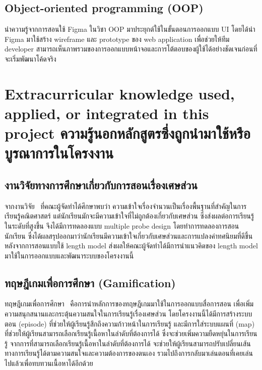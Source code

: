     \subsection{Object-oriented programming (OOP)}
    นำความรู้จากการสอนใช้ Figma ในวิชา OOP มาประยุกต์ใช้ในขั้นตอนการออกแบบ UI โดยได้นำ Figma มาใช้สร้าง wireframe และ prototype ของ web application 
    เพื่อช่วยให้ทีม developer สามารถเห็นภาพรวมของการออกแบบหน้าจอและการโต้ตอบของผู้ใช้ได้อย่างชัดเจนก่อนที่จะเริ่มพัฒนาโค้ดจริง

\section{\ifenglish%
Extracurricular knowledge used, applied, or integrated in this project
\else%
ความรู้นอกหลักสูตรซึ่งถูกนำมาใช้หรือบูรณาการในโครงงาน
\fi
}
\subsection{งานวิจัยทางการศึกษาเกี่ยวกับการสอนเรื่องเศษส่วน}
    จากงานวิจัย~\cite{rojo_length_models} ที่คณะผู้จัดทำได้ศึกษาพบว่า ความเข้าใจเรื่องจำนวนเป็นเรื่องพื้นฐานที่สำคัญในการเรียนรู้คณิตศาสตร์ แต่นักเรียนมักจะมีความเข้าใจที่ไม่ถูกต้องเกี่ยวกับเศษส่วน ซึ่งส่งผลต่อการเรียนรู้ในระดับที่สูงขึ้น
    จึงได้มีการทดลองแบบ multiple probe design โดยทำการทดลองการสอนนักเรียน ซึ่งได้ผลสรุปออกมาว่านักเรียนมีความเข้าใจเกี่ยวกับเศษส่วนและการแปลงค่าทศนิยมที่ดีขึ้นหลังจากการสอนแบบใช้ length model
    ส่งผลให้คณะผู้จัดทำได้มีการนำแนวคิดของ length model มาใช้ในการออกแบบและพัฒนาระบบของโครงงานนี้

\subsection[ทฤษฎีเกมเพื่อการศึกษา]{ทฤษฎีเกมเพื่อการศึกษา (Gamification)}
    ทฤษฎีเกมเพื่อการศึกษา~\cite{Gamifi} คือการนำหลักการของทฤษฎีเกมมาใช้ในการออกแบบสื่อการสอน เพื่อเพิ่มความสนุกสนานและกระตุ้นความสนใจในการเรียนรู้เรื่องเศษส่วน โดยโครงงานนี้ได้มีการสร้างระบบตอน (episode) ที่ช่วยให้ผู้เรียนรู้สึกถึงความก้าวหน้าในการเรียนรู้
    และมีการใส่ระบบแผนที่ (map) ที่ช่วยให้ผู้เรียนสามารถเลือกเรียนรู้เนื้อหาในลำดับที่ต้องการได้ ซึ่งจะช่วยเพิ่มความยืดหยุ่นในการเรียนรู้ จากการที่สามารถเลือกเรียนรู้เนื้อหาในลำดับที่ต้องการได้ จะช่วยให้ผู้เรียนสามารถปรับเปลี่ยนเส้นทางการเรียนรู้ได้ตามความสนใจและความต้องการของตนเอง รวมไปถึงการกลับมาเล่นตอนที่เคยเล่นไปแล้วเพื่อทบทวนเนื้อหาได้อีกด้วย

